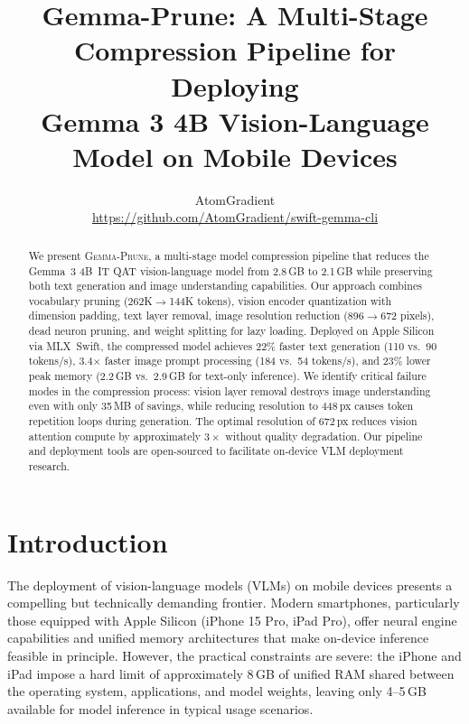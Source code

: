 \documentclass[11pt]{article}
\title{Gemma-Prune: A Multi-Stage Compression Pipeline for Deploying\\Gemma 3 4B Vision-Language Model on Mobile Devices}
\author{
    AtomGradient\\
    \url{https://github.com/AtomGradient/swift-gemma-cli}
}
\date{}
\newcommand{\gemma}{\textsc{Gemma-Prune}}
\begin{document}
\maketitle

\begin{abstract}
We present \gemma{}, a multi-stage model compression pipeline that reduces the Gemma~3 4B~IT QAT vision-language model from 2.8\,GB to 2.1\,GB while preserving both text generation and image understanding capabilities. Our approach combines vocabulary pruning (262K$\rightarrow$144K tokens), vision encoder quantization with dimension padding, text layer removal, image resolution reduction (896$\rightarrow$672 pixels), dead neuron pruning, and weight splitting for lazy loading. Deployed on Apple Silicon via MLX~Swift, the compressed model achieves 22\% faster text generation (110 vs.\ 90 tokens/s), 3.4$\times$ faster image prompt processing (184 vs.\ 54 tokens/s), and 23\% lower peak memory (2.2\,GB vs.\ 2.9\,GB for text-only inference). We identify critical failure modes in the compression process: vision layer removal destroys image understanding even with only 35\,MB of savings, while reducing resolution to 448\,px causes token repetition loops during generation. The optimal resolution of 672\,px reduces vision attention compute by approximately $3\times$ without quality degradation. Our pipeline and deployment tools are open-sourced to facilitate on-device VLM deployment research.
\end{abstract}

\section{Introduction}
\label{sec:introduction}

The deployment of vision-language models (VLMs) on mobile devices presents a compelling but technically demanding frontier. Modern smartphones, particularly those equipped with Apple Silicon (iPhone 15 Pro, iPad Pro), offer neural engine capabilities and unified memory architectures that make on-device inference feasible in principle. However, the practical constraints are severe: the iPhone and iPad impose a hard limit of approximately 8\,GB of unified RAM shared between the operating system, applications, and model weights, leaving only 4--5\,GB available for model inference in typical usage scenarios.
\end{document}
